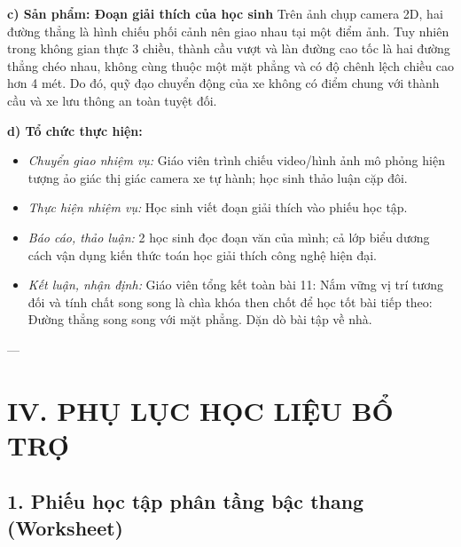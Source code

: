 \documentclass[12pt, a4paper]{article}
\begin{document}
\noindent \textbf{c) Sản phẩm: Đoạn giải thích của học sinh}
Trên ảnh chụp camera 2D, hai đường thẳng là hình chiếu phối cảnh nên giao nhau tại một điểm ảnh. Tuy nhiên trong không gian thực 3 chiều, thành cầu vượt và làn đường cao tốc là hai đường thẳng chéo nhau, không cùng thuộc một mặt phẳng và có độ chênh lệch chiều cao hơn 4 mét. Do đó, quỹ đạo chuyển động của xe không có điểm chung với thành cầu và xe lưu thông an toàn tuyệt đối.

\noindent \textbf{d) Tổ chức thực hiện:}
\begin{itemize}[leftmargin=0.8cm]
    \item \textit{Chuyển giao nhiệm vụ:} Giáo viên trình chiếu video/hình ảnh mô phỏng hiện tượng ảo giác thị giác camera xe tự hành; học sinh thảo luận cặp đôi.
    \item \textit{Thực hiện nhiệm vụ:} Học sinh viết đoạn giải thích vào phiếu học tập.
    \item \textit{Báo cáo, thảo luận:} 2 học sinh đọc đoạn văn của mình; cả lớp biểu dương cách vận dụng kiến thức toán học giải thích công nghệ hiện đại.
    \item \textit{Kết luận, nhận định:} Giáo viên tổng kết toàn bài 11: Nắm vững vị trí tương đối và tính chất song song là chìa khóa then chốt để học tốt bài tiếp theo: Đường thẳng song song với mặt phẳng. Dặn dò bài tập về nhà.
\end{itemize}

---

\section*{IV. PHỤ LỤC HỌC LIỆU BỔ TRỢ}

\subsection*{1. Phiếu học tập phân tầng bậc thang (Worksheet)}
\end{document}
